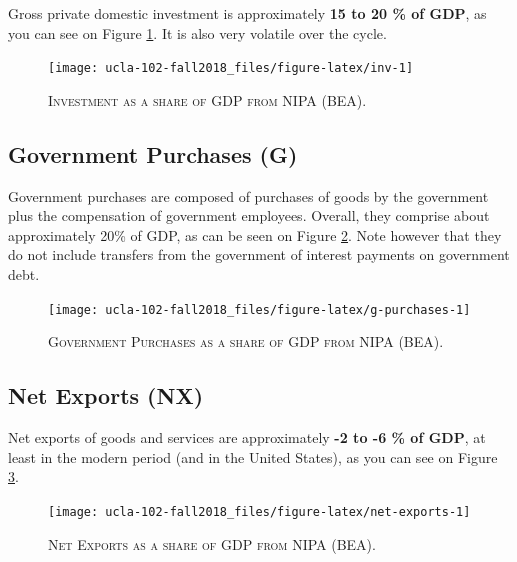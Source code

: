 \documentclass[]{book}
\theoremstyle{definition}
\theoremstyle{definition}
\theoremstyle{definition}
\theoremstyle{remark}
\begin{document}
Gross private domestic investment is approximately \textbf{15 to 20 \%
of GDP}, as you can see on Figure \ref{fig:inv}. It is also very
volatile over the cycle.



\begin{figure}

{\centering \texttt{[image: ucla-102-fall2018\_files/figure-latex/inv-1]} 

}

\caption{\textsc{Investment as a share of GDP from NIPA (BEA)}.}\label{fig:inv}
\end{figure}

\hypertarget{gov}{\subsection{Government Purchases (G)}\label{gov}}

Government purchases are composed of purchases of goods by the
government plus the compensation of government employees. Overall, they
comprise about approximately 20\% of GDP, as can be seen on Figure
\ref{fig:g-purchases}. Note however that they do not include transfers
from the government of interest payments on government debt.




\begin{figure}

{\centering \texttt{[image: ucla-102-fall2018\_files/figure-latex/g-purchases-1]} 

}

\caption{\textsc{Government Purchases as a share of GDP
from NIPA (BEA)}.}\label{fig:g-purchases}
\end{figure}

\hypertarget{net-exports}{\subsection{Net Exports
(NX)}\label{net-exports}}

Net exports of goods and services are approximately \textbf{-2 to -6 \%
of GDP}, at least in the modern period (and in the United States), as
you can see on Figure \ref{fig:net-exports}.




\begin{figure}

{\centering \texttt{[image: ucla-102-fall2018\_files/figure-latex/net-exports-1]} 

}

\caption{\textsc{Net Exports as a share of GDP from NIPA
(BEA)}.}\label{fig:net-exports}
\end{figure}
\end{document}
